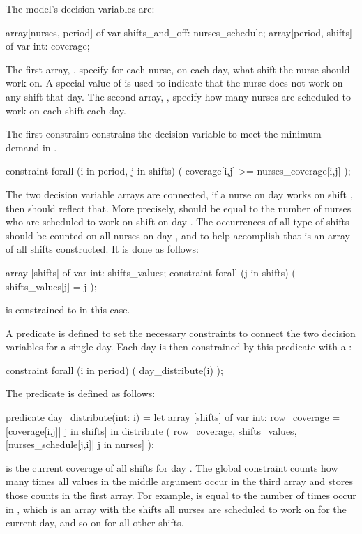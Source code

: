 \documentclass[a4paper,12pt]{article}
\begin{document}
The model's decision variables are:
\begin{mznnobreak}[label=lst:vars,caption={\null}]
array[nurses, period] of var shifts_and_off: nurses_schedule;
array[period, shifts] of var int: coverage;
\end{mznnobreak}
The first array, , specify for each nurse, on each day, what shift the
nurse should work on. A special value of  is used to indicate that the
nurse does not work on any shift that day. The second array, , specify how
many nurses are scheduled to work on each shift each day.

The first constraint constrains the decision variable  to meet the minimum
demand in .
\begin{mznnobreak}[caption={\null}]
constraint forall (i in period, j in shifts) (
   coverage[i,j] >= nurses_coverage[i,j]
);
\end{mznnobreak}

The two decision variable arrays are connected, if a nurse  on day  works on
shift , then should  reflect that. More precisely,
 should be equal to the number of nurses who are scheduled to work on
shift  on day . The occurrences of all type of shifts should be counted on all nurses on
day , and to help accomplish that is an array of all shifts 
constructed. It is done as follows:
\begin{mznnobreak}[label=lst:shifts,caption={\null}]
array [shifts] of var int: shifts_values;
constraint forall (j in shifts) (
  shifts_values[j] = j
);
\end{mznnobreak}
 is constrained to \mi{[1,2,3]} in this case.

A predicate  is defined to set the necessary constraints to connect the
two decision variables for a single day. Each day is then constrained by this predicate
with a :
\begin{mznnobreak}[caption={\null}]
constraint forall (i in period) (
  day_distribute(i)
);
\end{mznnobreak}
The predicate is defined as follows:
\begin{mznnobreak}[label=lst:distribute,caption={\null}]
predicate day_distribute(int: i) = let {
  array [shifts] of var int: row_coverage =
    [coverage[i,j]| j in shifts]
  }
  in distribute (
    row_coverage,
    shifts_values,
    [nurses_schedule[j,i]| j in nurses]
    );
\end{mznnobreak}
\begin{sloppypar}
   is the current coverage of all shifts for day . The global
  constraint  counts how many times all values in the middle argument occur
  in the third array and stores those counts in the first array. For example,
   is equal to the number of times  occur in
  \mbox{}, which is an array with the
  shifts all nurses are scheduled to work on for the current day, and so on for all other
  shifts.
\end{sloppypar}
\end{document}
